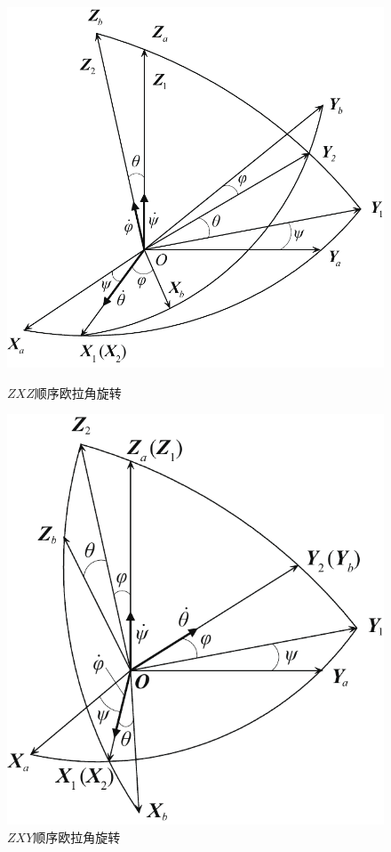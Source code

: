 \begin{figure}[!htb]
	\begin{minipage}{0.5\linewidth}
		\centering
		\includegraphics[width=0.8\linewidth]{pic/ZXZ}
		\vspace*{-1em}
		\caption{$ZXZ$顺序欧拉角旋转}
		\label{ZXZ}
	\end{minipage}
	\begin{minipage}{0.5\linewidth}
		\centering
		\includegraphics[width=0.695\linewidth]{pic/ZXY}
		\vspace*{-1em}
		\caption{$ZXY$顺序欧拉角旋转}
		\label{ZXY}
	\end{minipage}
\end{figure}


